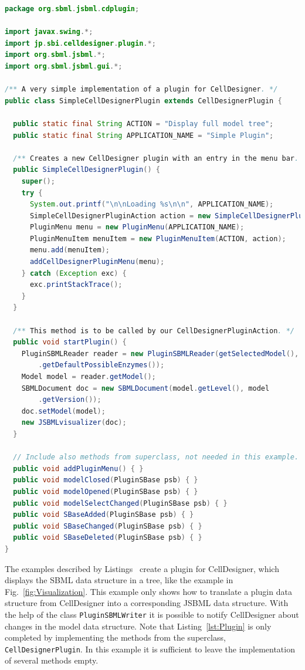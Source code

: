 \begin{lstlisting}[language=Java,float,caption={A simple example for a
CellDesigner plugin using JSBML as a communication layer},label=lst:Plugin]
package org.sbml.jsbml.cdplugin;

import javax.swing.*;
import jp.sbi.celldesigner.plugin.*;
import org.sbml.jsbml.*;
import org.sbml.jsbml.gui.*;

/** A very simple implementation of a plugin for CellDesigner. */
public class SimpleCellDesignerPlugin extends CellDesignerPlugin {

  public static final String ACTION = "Display full model tree";
  public static final String APPLICATION_NAME = "Simple Plugin";

  /** Creates a new CellDesigner plugin with an entry in the menu bar. */
  public SimpleCellDesignerPlugin() {
    super();
    try {
      System.out.printf("\n\nLoading %s\n\n", APPLICATION_NAME);
      SimpleCellDesignerPluginAction action = new SimpleCellDesignerPluginAction(this);
      PluginMenu menu = new PluginMenu(APPLICATION_NAME);
      PluginMenuItem menuItem = new PluginMenuItem(ACTION, action);
      menu.add(menuItem);
      addCellDesignerPluginMenu(menu);
    } catch (Exception exc) {
      exc.printStackTrace();
    }
  }

  /** This method is to be called by our CellDesignerPluginAction. */
  public void startPlugin() {
    PluginSBMLReader reader = new PluginSBMLReader(getSelectedModel(), SBO
        .getDefaultPossibleEnzymes());
    Model model = reader.getModel();
    SBMLDocument doc = new SBMLDocument(model.getLevel(), model
        .getVersion());
    doc.setModel(model);
    new JSBMLvisualizer(doc);
  }

  // Include also methods from superclass, not needed in this example.
  public void addPluginMenu() { }
  public void modelClosed(PluginSBase psb) { }
  public void modelOpened(PluginSBase psb) { }
  public void modelSelectChanged(PluginSBase psb) { }
  public void SBaseAdded(PluginSBase psb) { }
  public void SBaseChanged(PluginSBase psb) { }
  public void SBaseDeleted(PluginSBase psb) { }
}
\end{lstlisting}
The examples described by Listings~
create a plugin for CellDesigner, which displays the SBML data structure
in a tree, like the example in Fig.~\vref{fig:Visualization}. This example only
shows how to translate a plugin data structure
from CellDesigner into a corresponding JSBML data structure. With the help of
the class \texttt{PluginSBMLWriter} it is possible to notify CellDesigner about
changes in the model data structure. Note that Listing~\vref{lst:Plugin} is only
completed by implementing the methods from the superclass,
\texttt{CellDesignerPlugin}. In this example it is sufficient to leave the
implementation of several methods empty.


